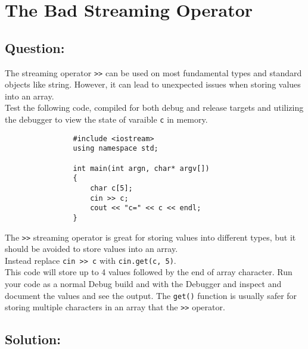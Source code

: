 \documentclass[Lab-B.tex]{subfiles}
\begin{document}
    \section{The Bad Streaming Operator}
        \subsection*{Question:}
            The streaming operator \texttt{>>} can be used on most fundamental types and standard objects like string. However, 
            it can lead to unexpected issues when storing values into an array.\\

            Test the following code, compiled for both debug and release targets and 
            utilizing the debugger to view the state of varaible \texttt{c} in memory. \\
    
            \begin{verbatim}
                #include <iostream>
                using namespace std;

                int main(int argn, char* argv[])
                {
                    char c[5];
                    cin >> c;
                    cout << "c=" << c << endl;
                }
            \end{verbatim}

            The \texttt{>>} streaming operator is great for storing values into different types, 
            but it should be avoided to store values into an array.\\

            Instead replace \texttt{cin >> c} with \texttt{cin.get(c, 5)}.\\
            This code will store up to 4 values followed by the end of array character. 
            Run your code as a normal Debug build and with the Debugger and inspect and document the values and see the output. 
            The \texttt{get()} function is usually safer for storing multiple characters in an array that the \texttt{>>} operator.
            
        \subsection*{Solution:}
            \inputminted{cpp}{../Tasks/02-Bad-Streaming/Bad-Streaming.cpp}%
\end{document}
